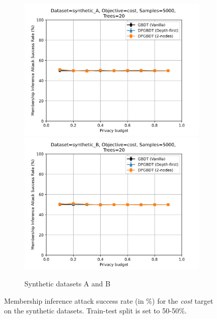 \begin{figure}[h!]
  \begin{subfigure}{\linewidth}
  \includegraphics[width=.5\linewidth]{images/evaluation/5050-attack_synthetic_A_cost_5000.png}\hfill
  \includegraphics[width=.5\linewidth]{images/evaluation/5050-attack_synthetic_B_cost_5000.png}
  \caption{Synthetic datasets A and B}
  \end{subfigure}\par\medskip
  \caption{\label{fig:attack_cost_50}Membership inference attack success rate (in $\%$) for the \textit{cost} target on the synthetic datasets. Train-test split is set to 50-50\%.}
\end{figure}
